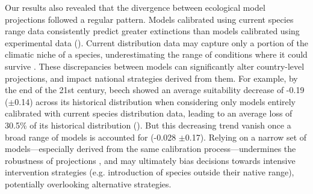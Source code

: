 \documentclass[11pt,letter]{article}
\begin{document}
Our results also revealed that the divergence between ecological model projections followed a regular pattern. Models calibrated using current species range data consistently predict greater extinctions than models calibrated using experimental data (). 
Current distribution data may capture only a portion of the climatic niche of a species, underestimating the range of conditions where it could survive \citep{Chevalier2024, NoguesBravo2016}.
These discrepancies between models can significantly alter country-level projections, and impact national strategies derived from them. 
For example, by the end of the 21st century, beech showed an average suitability decrease of -0.19 ($\pm$0.14) across its historical distribution when considering only models entirely calibrated with current species distribution data, leading to an average loss of 30.5\% of its historical distribution (). But this decreasing trend vanish once a broad range of models is accounted for (-0.028 $\pm$0.17).
Relying on a narrow set of models---especially derived from the same calibration process---undermines the robustness of projections \citep{Dawson2011}, and may ultimately bias decisions towards intensive intervention strategies (e.g. introduction of species outside their native range), potentially overlooking alternative strategies.


\end{document}
